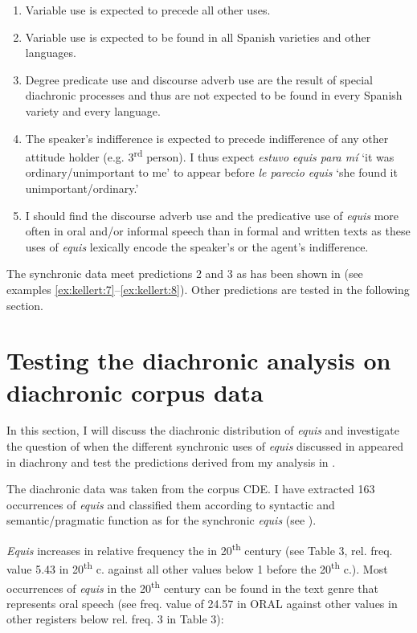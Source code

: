 \documentclass[output=paper]{langsci/langscibook}
\begin{document}
\begin{enumerate}
	\item Variable use is expected to precede all other uses.
	\item Variable use is expected to be found in all Spanish varieties and other languages.
	\item Degree predicate use and discourse adverb use are the result of special diachronic processes and thus are not expected to be found in every Spanish variety and every language.
	\item The speaker’s indifference is expected to precede indifference of any other attitude holder (e.g. 3\textsuperscript{rd} person). I thus expect \textit{estuvo equis para mí} ‘it was ordinary/unimportant to me’ to appear before \textit{le parecio equis} ‘she found it unimportant/ordinary.’
	\item I should find the discourse adverb use and the predicative use of \textit{equis} more often in oral and/or informal speech than in formal and written texts as these uses of \textit{equis} lexically encode the speaker’s or the agent’s indifference.
\end{enumerate}

The synchronic data meet predictions 2 and 3 as has been shown in  (see examples \ref{ex:kellert:7}--\ref{ex:kellert:8}). Other predictions are tested in the following section.

\section{Testing the diachronic analysis on diachronic corpus data}\label{sec:kellert:5}
In this section, I will discuss the diachronic distribution of \textit{equis} and investigate the question of when the different synchronic uses of \textit{equis} discussed in  appeared in diachrony and test the predictions derived from my analysis in .

The diachronic data was taken from the corpus CDE. I have extracted 163 occurrences of \textit{equis} and classified them according to syntactic and semantic/pragmatic function as for the synchronic \textit{equis} (see ).

\textit{Equis} increases in relative frequency the in 20\textsuperscript{th} century (see Table 3, rel. freq. value 5.43 in 20\textsuperscript{th} c. against all other values below 1 before the 20\textsuperscript{th} c.). Most occurrences of \textit{equis} in the 20\textsuperscript{th} century can be found in the text genre that represents oral speech (see freq. value of 24.57 in ORAL against other values in other registers below rel. freq. 3 in Table 3):
\end{document}
